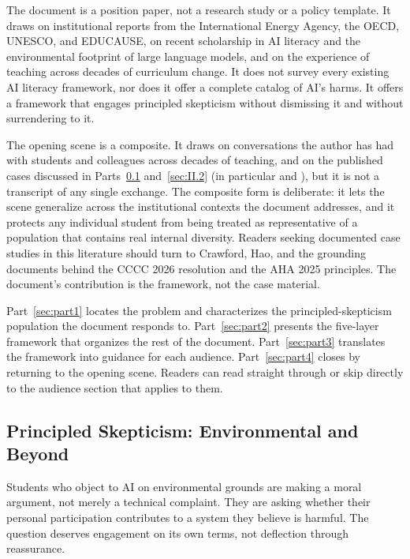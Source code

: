 \documentclass[12pt]{article}
\begin{document}
The document is a position paper, not a research study or a policy template. It draws on institutional reports from the International Energy Agency, the OECD, UNESCO, and EDUCAUSE, on recent scholarship in AI literacy and the environmental footprint of large language models, and on the experience of teaching across decades of curriculum change. It does not survey every existing AI literacy framework, nor does it offer a complete catalog of AI's harms. It offers a framework that engages principled skepticism without dismissing it and without surrendering to it.

The opening scene is a composite. It draws on conversations the author has had with students and colleagues across decades of teaching, and on the published cases discussed in Parts~\ref{sec:I.2} and~\ref{sec:II.2} (in particular \textcite{crawford2021atlas} and \textcite{hao2025empire}), but it is not a transcript of any single exchange. The composite form is deliberate: it lets the scene generalize across the institutional contexts the document addresses, and it protects any individual student from being treated as representative of a population that contains real internal diversity. Readers seeking documented case studies in this literature should turn to Crawford, Hao, and the grounding documents behind the CCCC 2026 resolution and the AHA 2025 principles. The document's contribution is the framework, not the case material.

Part~\ref{sec:part1} locates the problem and characterizes the principled-skepticism population the document responds to. Part~\ref{sec:part2} presents the five-layer framework that organizes the rest of the document. Part~\ref{sec:part3} translates the framework into guidance for each audience. Part~\ref{sec:part4} closes by returning to the opening scene. Readers can read straight through or skip directly to the audience section that applies to them.

\subsection{Principled Skepticism: Environmental and Beyond}
\label{sec:I.2}

Students who object to AI on environmental grounds are making a moral argument, not merely a technical complaint. They are asking whether their personal participation contributes to a system they believe is harmful. The question deserves engagement on its own terms, not deflection through reassurance.
\end{document}
